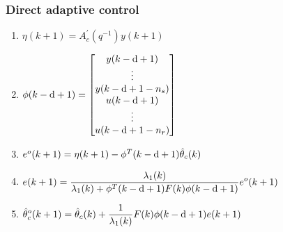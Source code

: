\begin{frame}
    \frametitle{Direct adaptive control}

    \begin{enumerate}
        \item
        $\eta(k+1) = A_c^{'}(q^{-1}) y(k+1)$

        \item
        $\phi(k-\textrm{d}+1) = \begin{bmatrix}
                y(k-\textrm{d}+1) \\
                \vdots \\
                y(k-\textrm{d}+1-n_s) \\
                u(k-\textrm{d}+1) \\
                \vdots \\
                u(k-\textrm{d}+1-n_r)
            \end{bmatrix}$

        \item
        $e^o(k+1) = \eta(k+1) - \phi^T(k-\textrm{d}+1) \hat{\theta}_c(k)$

        \item
        $\displaystyle e(k+1) = \frac{ \lambda_1(k) }
            { \lambda_1(k) + \phi^T(k-\textrm{d}+1) F(k) \phi(k-\textrm{d}+1) } e^o(k+1)$

        \item
        $\displaystyle \hat{\theta}_c^o(k+1) = \hat{\theta}_c(k) + \frac{1}{\lambda_1(k)} F(k) \phi(k-\textrm{d}+1) e(k+1)$
    \end{enumerate}
\end{frame}

